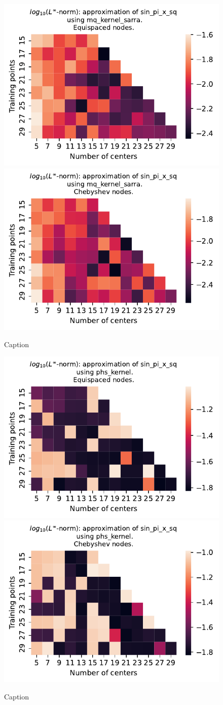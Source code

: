 \documentclass[12pt]{report} %
\begin{document}
\begin{figure}[ht]
    \centering
    
    \includegraphics[width=.49\textwidth]{imagenes/experiments/1d/variational/sin_pi_x_sq-Kmq_kernel_sarra-Equi.pdf}
    \includegraphics[width=.49\textwidth]{imagenes/experiments/1d/variational/sin_pi_x_sq-Kmq_kernel_sarra-Cheb.pdf}
    \caption{Caption}
    \label{fig:sin-pi-x-sq-sarra}
\end{figure}

\begin{figure}[ht]
    \centering
    
    \includegraphics[width=.49\textwidth]{imagenes/experiments/1d/variational/sin_pi_x_sq-Kphs_kernel-Equi.pdf}
    \includegraphics[width=.49\textwidth]{imagenes/experiments/1d/variational/sin_pi_x_sq-Kphs_kernel-Cheb.pdf}
    \caption{Caption}
    \label{fig:sin-pi-x-sq-phs}
\end{figure}
\end{document}
